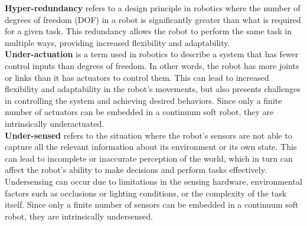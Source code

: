 \noindent \textbf{Hyper-redundancy}  refers to a design principle in robotics where the number of degrees of freedom (DOF) in a robot is significantly greater than what is required for a given task. This redundancy allows the robot to perform the same task in multiple ways, providing increased flexibility and adaptability. %
\\

\noindent \textbf{Under-actuation} is a term used in robotics to describe a system that has fewer control inputs than degrees of freedom. In other words, the robot has more joints or links than it has actuators to control them. This can lead to increased flexibility and adaptability in the robot's movements, but also presents challenges in controlling the system and achieving desired behaviors. Since only a finite number of actuators can be embedded in a continuum soft robot, they are intrinsically underactuated. \\

\noindent \textbf{Under-sensed} refers to the situation where the robot's sensors are not able to capture all the relevant information about its environment or its own state. This can lead to incomplete or inaccurate perception of the world, which in turn can affect the robot's ability to make decisions and perform tasks effectively. Undersensing can occur due to limitations in the sensing hardware, environmental factors such as occlusions or lighting conditions, or the complexity of the task itself. Since only a finite number of sensors can be embedded in a continuum soft robot, they are intrinsically undersensed.